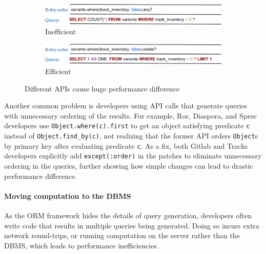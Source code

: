 \begin{figure}
  \vspace{-0.05in}
  \centering
  \begin{subfigure}[t]{60mm}

\includegraphics[width=0.95\columnwidth]{figs/spreeAny}
  \caption{Inefficient}
  
  \label{fig:spreeAny}
  \end{subfigure}
  
    \centering
  \begin{subfigure}[t]{60mm}
  \includegraphics[width=0.95\columnwidth]{figs/spreeExists}
  	\caption{Efficient}
    
  \label{fig:spreeExists}
  \end{subfigure}

  \caption{Different APIs cause huge performance difference}
  \label{fig:spreeAnyVsExists}
  \vspace{-0.25in}
\end{figure}

Another common problem is developers using API calls that generate queries with unnecessary ordering of the results. For example, Ror, Diaspora, and Spree developers use \texttt{Object.}\texttt{where(c).first} to get an object satisfying predicate \texttt{c} instead of \texttt{Object.find\_by(c)}, not realizing that the former API orders {\tt Object}s by primary key after evaluating predicate {\tt c}. 
As a fix, both Gitlab and Tracks developers explicitly add \texttt{except(:order)} in 
the patches to eliminate unnecessary ordering in the queries, further showing how simple changes can lead to drastic performance difference.

\vspace{-0.08in} 
\paragraph{\bf{Moving computation to the DBMS}} %
As the ORM framework hides the details of query generation, developers often write code that results in multiple queries being generated. Doing so incurs extra network round-trips, or running computation on the server rather than the DBMS, which leads to performance inefficiencies.


